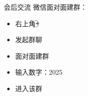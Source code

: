 \documentclass{beamer}
\begin{document}
\begin{frame}[t]{会后交流}
微信面对面建群：\\
\begin{itemize}
    \item 右上角\textcircled{+}
    \item 发起群聊
    \item 面对面建群
    \item 输入数字：\alert{2025}
    \item 进入该群
    \end{itemize}
\end{frame}
\end{document}
